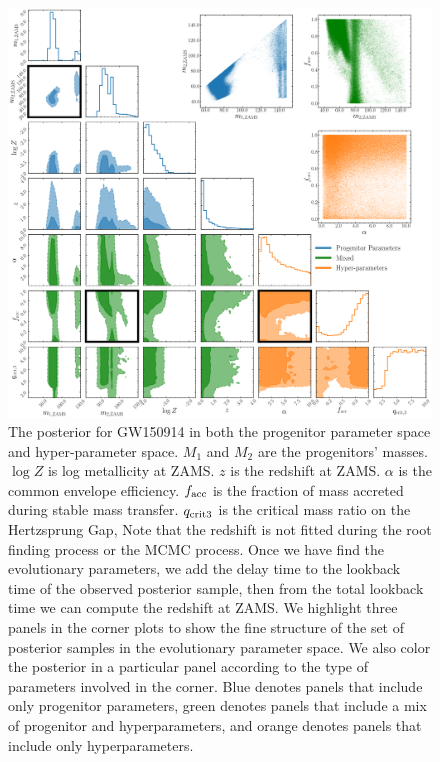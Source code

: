 \documentclass[twocolumn]{aastex631}
\begin{document}
\begin{figure}[h]
    \includegraphics[width=\textwidth]{static/GW150914_corner_zoomed_lowres.png}
    \caption{The posterior for GW150914 in both the progenitor parameter space and hyper-parameter space.
    $M_1$ and $M_2$ are the progenitors' masses. $\log{Z}$ is log metallicity at ZAMS.
    $z$ is the redshift at ZAMS. 
    $\alpha$ is the common envelope efficiency.
    $f_{\rm acc}$ is the fraction of mass accreted during stable mass transfer.
    $q_{\rm crit 3}$ is the critical mass ratio on the Hertzsprung Gap,
    Note that the redshift is not fitted during the root finding process or the MCMC process.
    Once we have find the evolutionary parameters, we add the delay time to the lookback time of the observed posterior sample,
    then from the total lookback time we can compute the redshift at ZAMS.
    We highlight three panels in the corner plots to show the fine structure of the set of posterior samples in the evolutionary parameter space.
    We also color the posterior in a particular panel according to the type of parameters involved in the corner.
    Blue denotes panels that include only progenitor parameters,
    green denotes panels that include a mix of progenitor and hyperparameters,
    and orange denotes panels that include only hyperparameters.
    }
    \label{fig:GW150914_posterior}
\end{figure}
\end{document}

